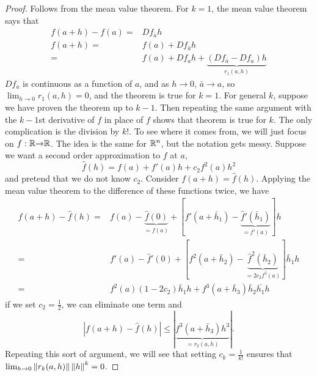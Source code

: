 \begin{proof}
  Follows from the mean value theorem. For $k=1$, the mean value
  theorem says that
  \begin{align*}
    f(a+h) - f(a) = & Df_{\bar{a}} h \\
    f(a+h) = & f(a) + Df_{\bar{a}} h \\
    = & f(a) + Df_{a} h + \underbrace{(Df_{\bar{a}} -Df_a)h}_{r_1(a,h)}  
  \end{align*}
  $Df_a$ is continuous as a function of $a$, and as $h \to 0$,
  $\bar{a} \to a$, so $\lim_{h \to 0} r_1(a,h) = 0$, and the theorem
  is true for $k = 1$. For general $k$, suppose we have proven the
  theorem up to $k-1$. Then repeating the same argument with the
  $k-1$st derivative of $f$ in place of $f$ shows that theorem is true
  for $k$. The only complication is the division by $k!$. To see where
  it comes from, we will just focus on $f:\mathbb{R} {\rightarrow} \mathbb{R}$. The idea is the
  same for $\mathbb{R}^n$, but the notation gets messy. Suppose we want a
  second order approximation to $f$ at $a$, 
  \[ \hat{f}(h) = f(a) + f'(a) h + c_2 f^2(a) h^2 \] and pretend that we
  do not know $c_2$. Consider $f(a+h) = \hat{f}(h)$. Applying the mean value
  theorem to the difference of these functions twice, we have
  \begin{align*}
    f(a+h) - \hat{f}(h) = & f(a)-\underbrace{\hat{f}(0)}_{=f(a)}
    + \left[ f'(a + \bar{h}_1) -
      \underbrace{\hat{f}'(\bar{h}_1)}_{=f'(a)}\right] h \\
    = & f'(a) - \hat{f}'(0) + \left[f^{2}(a+\bar{h}_2) -
      \underbrace{\hat{f}^2(\bar{h}_2)}_{=2c_2 f^2(a)}\right] \bar{h}_1 h \\
    = & f^2(a) (1 - 2c_2) \bar{h}_1 h +
    f^3(a + \bar{h}_3)\bar{h}_2\bar{h_1} h 
  \end{align*}
  if we set $c_2 = \frac{1}{2}$, we can eliminate one term and 
  \[ |f(a+h) - \hat{f}(h) | \leq | \underbrace{f^3(a + \bar{h}_3)
    h^3}_{=r_2(a,h)} |.\]  
  Repeating this sort of argument, we will see that setting $c_k =
  \frac{1}{k!}$ ensures that $\lim_{h {\rightarrow} 0}
  \left\Vert {r_k(a,h)} \right\Vert{\left\Vert {h} \right\Vert^k}  = 0$.
\end{proof}

